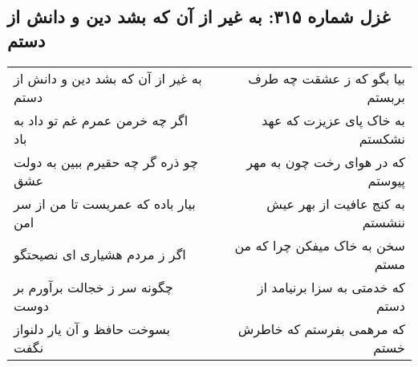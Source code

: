 \begin{center}
\section*{غزل شماره ۳۱۵: به غیر از آن که بشد دین و دانش از دستم}
\label{sec:sh315}
\begin{longtable}{l p{0.5cm} r}
به غیر از آن که بشد دین و دانش از دستم
&&
بیا بگو که ز عشقت چه طرف بربستم
\\
اگر چه خرمن عمرم غم تو داد به باد
&&
به خاک پای عزیزت که عهد نشکستم
\\
چو ذره گر چه حقیرم ببین به دولت عشق
&&
که در هوای رخت چون به مهر پیوستم
\\
بیار باده که عمریست تا من از سر امن
&&
به کنج عافیت از بهر عیش ننشستم
\\
اگر ز مردم هشیاری ای نصیحتگو
&&
سخن به خاک میفکن چرا که من مستم
\\
چگونه سر ز خجالت برآورم بر دوست
&&
که خدمتی به سزا برنیامد از دستم
\\
بسوخت حافظ و آن یار دلنواز نگفت
&&
که مرهمی بفرستم که خاطرش خستم
\\
\end{longtable}
\end{center}
